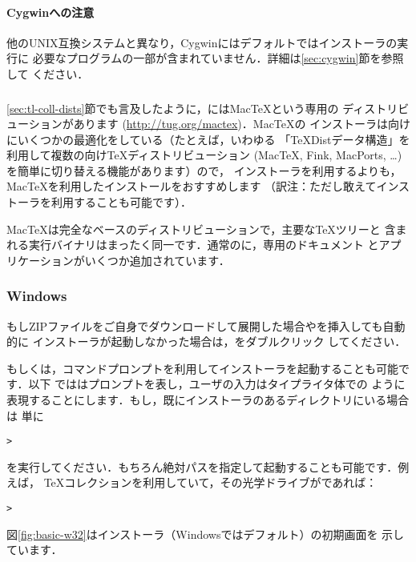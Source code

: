 \documentclass[uplatex,dvipdfmx]{jsarticle}
\begin{document}
\paragraph{Cygwinへの注意}
他のUNIX互換システムと異なり，Cygwinにはデフォルトでは\TL インストーラの実行に
必要なプログラムの一部が含まれていません．詳細は\ref{sec:cygwin}節を参照して
ください．

\subsubsection{\macOS}
\label{sec:macos}

\ref{sec:tl-coll-dists}節でも言及したように，\macOS にはMac\TeX という専用の
ディストリビューションがあります (\url{http://tug.org/mactex})．Mac\TeX の
インストーラは\macOS 向けにいくつかの最適化をしている（たとえば，いわゆる
「{\TeX}Distデータ構造」を利用して複数の\macOS 向け\TeX ディストリビューション
(Mac\TeX, Fink, MacPorts, \ldots) を簡単に切り替える機能があります）ので，\TL
インストーラを利用するよりも，Mac\TeX を利用したインストールをおすすめします
（訳注：ただし敢えて\TL インストーラを利用することも可能です）．

Mac\TeX は完全な\TL ベースのディストリビューションで，主要な\TeX ツリーと
含まれる実行バイナリはまったく同一です．通常の\TL に，\macOS 専用のドキュメント
とアプリケーションがいくつか追加されています．

\subsubsection{Windows}\label{sec:wininst}

もしZIPファイルをご自身でダウンロードして展開した場合や\DVD を挿入しても自動的に
インストーラが起動しなかった場合は，をダブルクリック
してください．

もしくは，コマンドプロンプトを利用してインストーラを起動することも可能です．以下
では\code{>}はプロンプトを表し，ユーザの入力はタイプライタ体での
ように表現することにします．もし，既にインストーラのあるディレクトリにいる場合は
単に
%
\begin{alltt}
> 
\end{alltt}
%
を実行してください．もちろん絶対パスを指定して起動することも可能です．例えば，
\TeX コレクション\DVD を利用していて，その光学ドライブがであれば：
%
\begin{alltt}
> 
\end{alltt}
%
図\ref{fig:basic-w32}は\GUI インストーラ（Windowsではデフォルト）の初期画面を
示しています．
\end{document}
